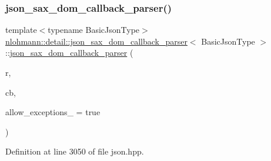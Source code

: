 \subsubsection{\texorpdfstring{json\_sax\_dom\_callback\_parser()}{json\_sax\_dom\_callback\_parser()}\hspace{0.1cm}{\footnotesize\ttfamily [1/3]}}
{\footnotesize\ttfamily template$<$typename Basic\+Json\+Type$>$ \\
\mbox{\hyperlink{classnlohmann_1_1detail_1_1json__sax__dom__callback__parser}{nlohmann\+::detail\+::json\+\_\+sax\+\_\+dom\+\_\+callback\+\_\+parser}}$<$ Basic\+Json\+Type $>$\+::\mbox{\hyperlink{classnlohmann_1_1detail_1_1json__sax__dom__callback__parser}{json\+\_\+sax\+\_\+dom\+\_\+callback\+\_\+parser}} (\begin{DoxyParamCaption}\item[{Basic\+Json\+Type \&}]{r,  }\item[{const \mbox{\hyperlink{classnlohmann_1_1detail_1_1json__sax__dom__callback__parser_a4f636086fa8e7cf26c35c8afd50903ce}{parser\+\_\+callback\+\_\+t}}}]{cb,  }\item[{const bool}]{allow\+\_\+exceptions\+\_\+ = {\ttfamily true} }\end{DoxyParamCaption})\hspace{0.3cm}{\ttfamily [inline]}}



Definition at line 3050 of file json.\+hpp.

\mbox{\label{classnlohmann_1_1detail_1_1json__sax__dom__callback__parser_a589998730e650a425b1b311e2e9f7f09}} 
